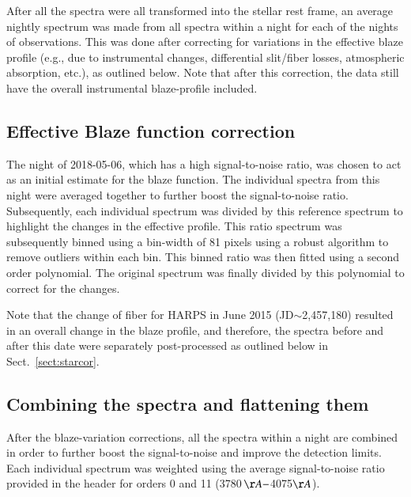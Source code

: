 \documentclass{aa}
\begin{document}
%
After all the spectra were all transformed into the stellar rest frame, an average nightly spectrum was made from all spectra within a night for each of the nights of observations. This was done after correcting for variations in the effective blaze profile (e.g., due to instrumental changes, differential slit/fiber losses, atmospheric absorption, etc.), as outlined below. Note that after this correction, the %
data still have the overall instrumental blaze-profile included.%


\subsection{Effective Blaze function correction}\label{sect:blaze}

The night of 2018-05-06, which has a high signal-to-noise ratio, was chosen to act as an initial estimate for the blaze function.%
The individual spectra from this night were averaged together to further boost the signal-to-noise ratio. Subsequently, each individual spectrum was divided by this reference spectrum to highlight the changes in the effective profile. This ratio spectrum was subsequently binned using a bin-width of 81 pixels using a robust algorithm to remove outliers within each bin. This binned ratio was then fitted using a second order polynomial. The original spectrum was finally divided by this polynomial to correct for the changes.

Note that the change of fiber for HARPS in June 2015 (JD$\sim$2,457,180) resulted in an overall change in the blaze profile, and therefore, the spectra before and after this date were separately post-processed as outlined below in Sect.~\ref{sect:starcor}.



\subsection{Combining the spectra and flattening them}\label{sect:comb}
After the blaze-variation corrections, all the spectra within a night are combined in order to further boost the signal-to-noise and improve the detection limits. Each individual spectrum was weighted using the average signal-to-noise ratio provided in the header for orders 0 and 11 (3780\,$\AA - $4075$\AA$).%

%
%
%
%
\end{document}
